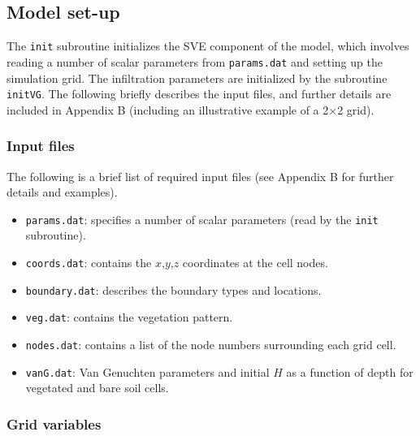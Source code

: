 \documentclass{article}
\newcommand{\code}[1]{\texttt{#1}}
\begin{document}
\subsection{Model set-up}
\label{SVEinit}
	
The \code{init} subroutine initializes the SVE component of the model,  which involves reading a number of scalar parameters from  \code{params.dat} and setting up the simulation grid.
 The infiltration parameters are initialized by the subroutine \code{initVG}.  The following briefly describes the input files, and further details are included in Appendix B (including an illustrative example of a  2$\times$2 grid).
  
\subsubsection*{Input files}

The following is a brief list of required input files (see Appendix B for further details and examples).

\begin{itemize}

	\item \code{params.dat}:  specifies a number of scalar parameters (read by the \code{init} subroutine).  

	\item \code{coords.dat}: contains the $x$,$y$,$z$ coordinates at the cell nodes.

	\item \code{boundary.dat}: describes the boundary types and locations.

	\item \code{veg.dat}: contains the vegetation pattern.

	\item \code{nodes.dat}: contains a list of the node numbers surrounding each grid cell.

	\item \code{vanG.dat}: Van Genuchten parameters and initial $H$ as a function of depth for vegetated and bare soil cells. 

\end{itemize}



\subsubsection*{Grid variables}
\end{document}
